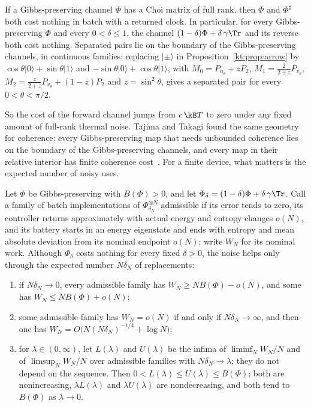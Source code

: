 \begin{proposition}\label{kt:prop:generic}
If a Gibbs-preserving channel $\Phi$ has a Choi matrix of full rank, then $\Phi$ and $\Phi^\sharp$ both cost nothing in batch with a returned clock. In particular, for every Gibbs-preserving $\Phi$ and every $0<\delta\le1$, the channel $(1-\delta)\Phi+\delta\,\gamma\Tr$ and its reverse both cost nothing. Separated pairs lie on the boundary of the Gibbs-preserving channels, in continuous families: replacing $|\pm\rangle$ in Proposition~\ref{kt:prop:arrow} by $\cos\theta|0\rangle+\sin\theta|1\rangle$ and $-\sin\theta|0\rangle+\cos\theta|1\rangle$, with $M_0=P_{u_\theta}+zP_2$, $M_1=\tfrac2{2+z}P_{v_\theta}$, $M_2=\tfrac{z}{2+z}P_{v_\theta}+(1-z)P_2$ and $z=\sin^2\theta$, gives a separated pair for every $0<\theta<\pi/2$.
\end{proposition}

So the cost of the forward channel jumps from $c\,\kB T$ to zero under any fixed amount of full-rank thermal noise. Tajima and Takagi found the same geometry for coherence: every Gibbs-preserving map that needs unbounded coherence lies on the boundary of the Gibbs-preserving channels, and every map in their relative interior has finite coherence cost~\cite{TajimaTakagi25}. For a finite device, what matters is the expected number of noisy uses.

\begin{proposition}\label{kt:prop:noise-horizon}
Let $\Phi$ be Gibbs-preserving with $B(\Phi)>0$, and let $\Phi_\delta=(1-\delta)\Phi+\delta\,\gamma\Tr$. Call a family of batch implementations of $\Phi_{\delta_N}^{\otimes N}$ admissible if its error tends to zero, its controller returns approximately with actual energy and entropy changes $o(N)$, and its battery starts in an energy eigenstate and ends with entropy and mean absolute deviation from its nominal endpoint $o(N)$; write $W_N$ for its nominal work. Although $\Phi_\delta$ costs nothing for every fixed $\delta>0$, the noise helps only through the expected number $N\delta_N$ of replacements:
\begin{enumerate}[label=(\alph*)]
\item if $N\delta_N\to0$, every admissible family has $W_N\ge NB(\Phi)-o(N)$, and some has $W_N\le NB(\Phi)+o(N)$;
\item some admissible family has $W_N=o(N)$ if and only if $N\delta_N\to\infty$, and then one has $W_N=O\bigl(N(N\delta_N)^{-1/4}+\log N\bigr)$;
\item for $\lambda\in(0,\infty)$, let $L(\lambda)$ and $U(\lambda)$ be the infima of $\liminf_NW_N/N$ and of $\limsup_NW_N/N$ over admissible families with $N\delta_N\to\lambda$; they do not depend on the sequence. Then $0<L(\lambda)\le U(\lambda)\le B(\Phi)$; both are nonincreasing, $\lambda L(\lambda)$ and $\lambda U(\lambda)$ are nondecreasing, and both tend to $B(\Phi)$ as $\lambda\to0$.
\end{enumerate}
\end{proposition}

